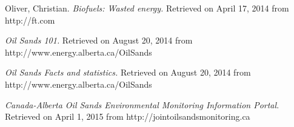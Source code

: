 \documentclass[11pt]{article}
\begin{document}
\begin{thebibliography}{9}
Oliver, Christian.  \emph{Biofuels: Wasted energy.} Retrieved on April 17, 2014 from http://ft.com

 \emph{Oil Sands 101.} Retrieved on August 20, 2014 from  http://www.energy.alberta.ca/OilSands

 \emph{Oil Sands Facts and statistics.} Retrieved on August 20, 2014 from http://www.energy.alberta.ca/OilSands
 
\emph{Canada-Alberta Oil Sands Environmental Monitoring Information Portal}. Retrieved on April 1, 2015 from http://jointoilsandsmonitoring.ca 
 
\end{thebibliography}
\end{document}
